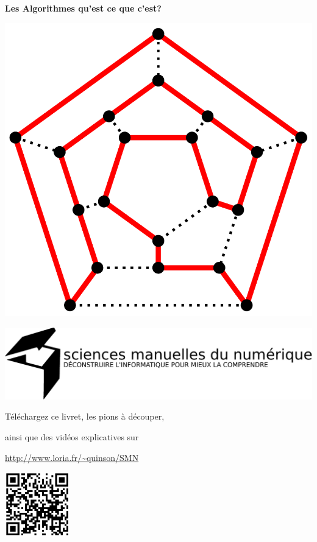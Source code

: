 \documentclass[a7paper,pagesize,DIV=14,10pt]{scrbook}
\begin{document}
%  
\begin{center}
  \textbf{{\huge Les Algorithmes} \Large qu'est ce que c'est? }
  
  \includegraphics[width=.5\linewidth]{img/Hamiltonian_path.pdf}

\medskip
\centerline{\includegraphics[width=.9\linewidth]{img/logo_SMN.pdf}}

\smallskip
\begin{spacing}{.8}
  \centerline{\footnotesize Téléchargez ce livret, les pions à découper,}
  \centerline{\footnotesize ainsi que des vidéos explicatives sur}

  \centerline{\small\color{blue}\url{http://www.loria.fr/~quinson/SMN}}
\end{spacing}

\includegraphics[width=.25\linewidth]{img/QRcode.pdf} 
\end{center}
\end{document}
